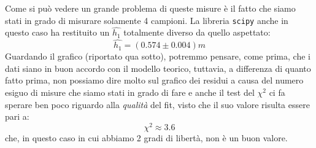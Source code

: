 \documentclass{article}
\begin{document}
\noindent Come si può vedere un grande problema di queste misure è il fatto che siamo stati in grado di misurare solamente 4 campioni. La libreria \texttt{scipy} anche in questo caso ha restituito un $\hat{h_1}$ totalmente diverso da quello aspettato:
\begin{equation}
	\hat{h_1} = (0.574 \pm 0.004) \unit{m}
\end{equation}
Guardando il grafico (riportato qua sotto), potremmo pensare, come prima, che i dati siano in buon accordo con il modello teorico, tuttavia, a differenza di quanto fatto prima, non possiamo dire molto  sul grafico dei residui a causa del numero esiguo di misure che siamo stati in grado di fare e anche il test del $\chi^2$ ci fa sperare ben poco riguardo alla \emph{qualità} del fit, visto che il suo valore risulta essere pari a: \\
\begin{equation}
	\chi^2 \approx 3.6
\end{equation}
che, in questo caso in cui abbiamo 2 gradi di libertà, non è un buon valore.
\\
\end{document}
